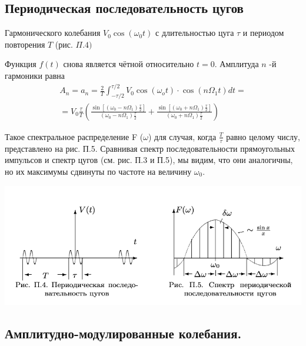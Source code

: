 \documentclass[a4paper, 12pt]{article}%
\begin{document}
\subsection{Периодическая последовательность цугов}
Гармонического колебания $V_{0} \cos \left(\omega_{0} t\right)$ с длительностью цуга $\tau$ и периодом повторения $T$ (рис. $\Pi .4)$
 
Функция $f(t)$ снова является чётной относительно $t=0 .$ Амплитуда $n$ -й гармоники равна
$$
\begin{array}{c}
A_{n}=a_{n}=\frac{2}{T} \int_{-\tau / 2}^{\tau / 2} V_{0} \cos \left(\omega_{o} t\right) \cdot \cos \left(n \Omega_{1} t\right) d t= \\
=V_{0} \frac{\tau}{T}\left(\frac{\sin \left[\left(\omega_{0}-n \Omega_{1}\right) \frac{\tau}{2}\right]}{\left(\omega_{0}-n \Omega_{1}\right) \frac{\tau}{2}}+\frac{\sin \left[\left(\omega_{0}+n \Omega_{1}\right) \frac{\tau}{2}\right]}{\left(\omega_{0}+n \Omega_{1}\right) \frac{\tau}{2}}\right)
\end{array}
$$

Такое спектральное распределение F ($\omega$) для случая, когда $\frac T\tau$ равно целому числу, представлено на рис. П.5. Сравнивая спектр последовательности прямоугольных импульсов и спектр цугов (см. рис. П.3 и П.5), мы видим, что они аналогичны, но их максимумы сдвинуты по частоте на величину $\omega_0$.

\begin{center}
\includegraphics[width=0.7\linewidth]{./anat/3.jpg}\\
\end{center}

\subsection{Амплитудно-модулированные колебания.}
\end{document}
